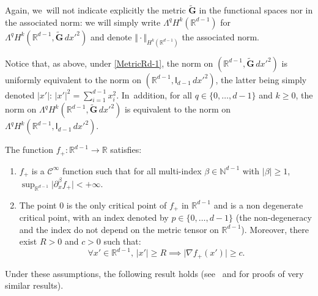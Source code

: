 \documentclass[10pt]{amsart}
\newenvironment{enumeratei}
{\bgroup\def\theenumi{\roman{enumi}}\def\theenumii{\arabic{enumii}}\begin{enumerate}}
{\end{enumerate}\egroup}
\newcommand{\mbf}[1]{\mathbf{#1}}
\theoremstyle{plain}
\theoremstyle{definition}
\newenvironment{manualassumption}[1]{%
\renewcommand\themanualassumptioninner{#1}%
\manualassumptioninner}{\endmanualassumptioninner}
\begin{document}
Again, we~will not indicate explicitly the metric $\tilde {\mbf G}$ in the
functional spaces nor in the associated norm: we will simply write $\Lambda^q H^k(\mathbb
R^{d-1})$ for $\Lambda^qH^k(\mathbb R^{d-1}, \tilde {\mbf G} \, dx'^2)$ and denote $ \Vert \cdot \Vert_{H^k(\mathbb R^{d-1})}$ the
associated norm.

Notice that, as above, under \ref{MetricRd-1}, the norm on $(\mathbb
R^{d-1}, \tilde {\mbf G} \, dx'^2)$ is uniformly equivalent to the
norm on $(\mathbb R^{d-1}, \mathsf I_{d-1} \, dx'^2)$, the latter
being simply denoted $\vert x'\vert$: $\vert x'\vert^2=\sum_{i=1}^{d-1}x_i^2$. In~addition, for all $q\in \{0,\ldots,d-1\}$ and $k\ge 0$, the norm
on $\Lambda^qH^k(\mathbb R^{d-1}, \tilde {\mbf G} \, dx'^2)$ is
equivalent to the norm on $\Lambda^qH^k(\mathbb R^{d-1}, \mathsf I_{d-1} \, dx'^2)$.

\begin{manualassumption}{$(\textup{Potential-}\mathbb R^{d-1})$}\label{PotentialRd-1}
The function $f_+: {\mathbb R^{d-1}}\to \mathbb R$ satisfies:
\begin{enumeratei}
\item\label{PotentialRd-1i}
$f_+$ is a $\mathcal C^\infty$ function such that for all multi-index
$\beta\in \mathbb N^{d-1}$ with $\vert \beta\vert \ge 1$, $\sup_{\mathbb R^{d-1}}\vert \partial_x^\beta f_+\vert<+\infty$.
\item\label{PotentialRd-1ii}
The point $0$ is the only critical point of $f_+$ in ${\mathbb
R^{d-1}}$ and is a non degenerate critical point, with an index
denoted by $p\in
\{0,\ldots,d-1\}$ (the non-degeneracy and the index do not depend on the metric tensor
on $\mathbb R^{d-1}$). Moreover, there exist $R>0$ and $c>0$ such that:
\[
\forall x'\in \mathbb R^{d-1}, \, \vert x'\vert \ge R \implies \vert \nabla f_+(x')\vert \ge c.
\]
\end{enumeratei}
\end{manualassumption}

Under these assumptions, the following result holds (see~\cite[Prop.\,3.3.2 \&~3.3.3]{helffer-nier-06} and\cite[Prop.\,2.2]{HKN} for proofs of very similar results).
\end{document}
